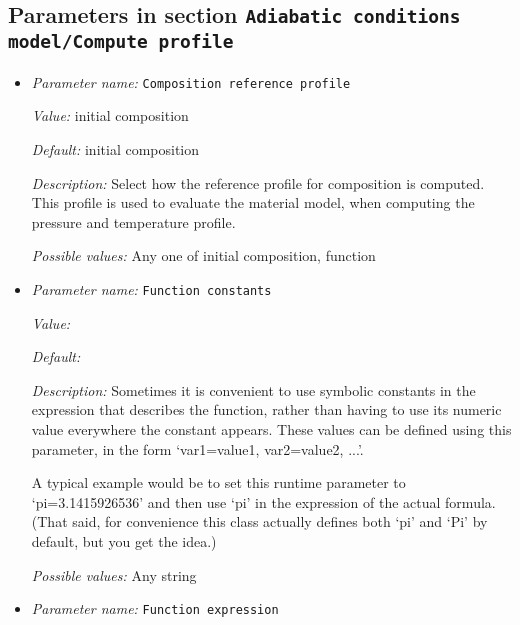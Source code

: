 \subsection{Parameters in section \tt Adiabatic conditions model/Compute profile}
\label{parameters:Adiabatic_20conditions_20model/Compute_20profile}

\begin{itemize}
\item {\it Parameter name:} {\tt Composition reference profile}
\label{parameters:Adiabatic conditions model/Compute profile/Composition reference profile}


{\it Value:} initial composition


{\it Default:} initial composition


{\it Description:} Select how the reference profile for composition is computed. This profile is used to evaluate the material model, when computing the pressure and temperature profile.


{\it Possible values:} Any one of initial composition, function
\item {\it Parameter name:} {\tt Function constants}
\label{parameters:Adiabatic conditions model/Compute profile/Function constants}


{\it Value:} 


{\it Default:} 


{\it Description:} Sometimes it is convenient to use symbolic constants in the expression that describes the function, rather than having to use its numeric value everywhere the constant appears. These values can be defined using this parameter, in the form `var1=value1, var2=value2, ...'.

A typical example would be to set this runtime parameter to `pi=3.1415926536' and then use `pi' in the expression of the actual formula. (That said, for convenience this class actually defines both `pi' and `Pi' by default, but you get the idea.)


{\it Possible values:} Any string
\item {\it Parameter name:} {\tt Function expression}
\label{parameters:Adiabatic conditions model/Compute profile/Function expression}



\end{itemize}
